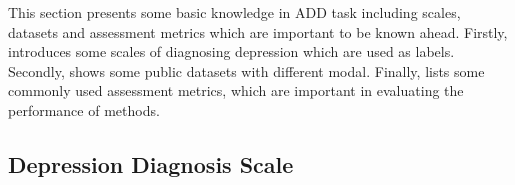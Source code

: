 This section presents some basic knowledge in ADD task including scales, datasets and assessment metrics which are important to be known ahead.
Firstly, introduces some scales of diagnosing depression which are used as labels.
Secondly, shows some public datasets with different modal.
Finally, lists some commonly used assessment metrics, which are important in evaluating the performance of methods.

\subsection{Depression Diagnosis Scale}
